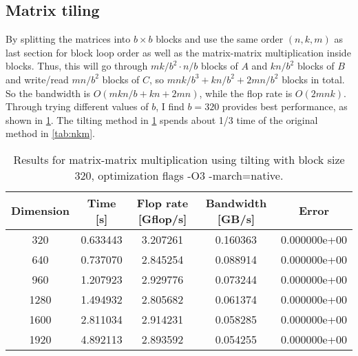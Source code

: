 \documentclass[10pt,a4paper]{article}
\theoremstyle{dotlessP}
\begin{document}
\subsection{Matrix tiling}
By splitting the matrices into $b\times b$ blocks and use the same order $(n,k,m)$ as last section for block loop order as well as the matrix-matrix multiplication inside blocks. Thus, this will go through $mk/b^2\cdot n/b$ blocks of $A$ and $kn/b^2$
blocks of $B$ and write/read $mn/b^2$ blocks of $C$, so $mnk/b^3+kn/b^2+2mn/b^2$ blocks in total. So the bandwidth is $O(mkn/b +kn+2mn)$, while the flop rate is $O(2mnk)$. Through trying different values of $b$, I find $b=320$ provides best performance, as shown in \cref{tab:block}. The tilting method in \cref{tab:block} spends about 1/3 time of the original method in \cref{tab:nkm}.
	\begin{table}[tbhp] 
	{\footnotesize
		\caption{Results for matrix-matrix multiplication using tilting with block size 320, optimization flags -O3 -march=native.
		}\label{tab:block}
		\begin{center}
			\begin{tabular}{ccccc}
				\hline 
				Dimension   &    Time [s] &  Flop rate [Gflop/s]     & Bandwidth  [GB/s] & Error\\ 
				\hline 
       320  &   0.633443  &   3.207261 &   0.160363 &  0.000000e+00\\ 
640  &   0.737070  &   2.845254 &   0.088914 &  0.000000e+00\\ 
960  &   1.207923  &   2.929776 &   0.073244 &  0.000000e+00\\ 
1280  &   1.494932  &   2.805682 &   0.061374 &  0.000000e+00\\ 
1600  &   2.811034  &   2.914231 &   0.058285 &  0.000000e+00\\ 
1920  &   4.892113  &   2.893592 &   0.054255 &  0.000000e+00\\ 
				\hline 
\end{tabular} 
\end{center}
}
\end{table}
\end{document}
